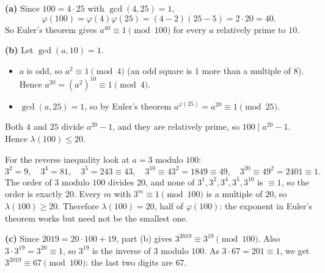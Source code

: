 \textbf{(a)} Since $100=4\cdot25$ with $\gcd(4,25)=1$,
\[
\varphi(100)=\varphi(4)\varphi(25)=(4-2)(25-5)=2\cdot20=\boxed{40}.
\]
So Euler's theorem gives $a^{40}\equiv1\pmod{100}$ for every $a$ relatively prime to $10$.

\textbf{(b)} Let $\gcd(a,10)=1$.
\begin{itemize}
\item $a$ is odd, so $a^2\equiv1\pmod4$ (an odd square is $1$ more than a multiple of $8$). Hence $a^{20}=\left(a^2\right)^{10}\equiv1\pmod4$.
\item $\gcd(a,25)=1$, so by Euler's theorem $a^{\varphi(25)}=a^{20}\equiv1\pmod{25}$.
\end{itemize}
Both $4$ and $25$ divide $a^{20}-1$, and they are relatively prime, so $100\mid a^{20}-1$. Hence $\lambda(100)\le20$.

For the reverse inequality look at $a=3$ modulo $100$:
\[
3^2=9,\quad 3^4=81,\quad 3^5=243\equiv43,\quad 3^{10}\equiv43^2=1849\equiv49,\quad 3^{20}\equiv49^2=2401\equiv1 .
\]
The order of $3$ modulo $100$ divides $20$, and none of $3^1,3^2,3^4,3^5,3^{10}$ is $\equiv1$, so the order is exactly $20$. Every $m$ with $3^m\equiv1\pmod{100}$ is a multiple of $20$, so $\lambda(100)\ge20$. Therefore $\boxed{\lambda(100)=20}$, half of $\varphi(100)$: the exponent in Euler's theorem works but need not be the smallest one.

\textbf{(c)} Since $2019=20\cdot100+19$, part (b) gives $3^{2019}\equiv3^{19}\pmod{100}$. Also $3\cdot3^{19}=3^{20}\equiv1$, so $3^{19}$ is the inverse of $3$ modulo $100$. As $3\cdot67=201\equiv1$, we get $3^{2019}\equiv67\pmod{100}$: the last two digits are $\boxed{67}$.
